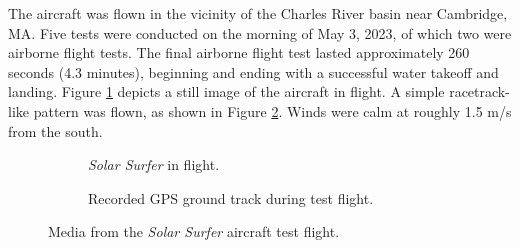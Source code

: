 The aircraft was flown in the vicinity of the Charles River basin near Cambridge, MA. Five tests were conducted on the morning of May 3, 2023, of which two were airborne flight tests. The final airborne flight test lasted approximately 260 seconds (4.3 minutes), beginning and ending with a successful water takeoff and landing. Figure \ref{fig:solar_surfer_flight} depicts a still image of the aircraft in flight. A simple racetrack-like pattern was flown, as shown in Figure \ref{fig:solar_surfer_track}. Winds were calm at roughly 1.5 m/s from the south.

\begin{figure}[h]
    \centering
    \begin{subfigure}[b]{0.45\textwidth}
        \caption{\emph{Solar Surfer} in flight.}
        \label{fig:solar_surfer_flight}
    \end{subfigure}
    \hfill
    \begin{subfigure}[b]{0.511\textwidth}
        \caption{Recorded GPS ground track during test flight.}
        \label{fig:solar_surfer_track}
    \end{subfigure}
    \caption{Media from the \emph{Solar Surfer} aircraft test flight.}
    \label{fig:solar_surfer_aircraft}
\end{figure}

